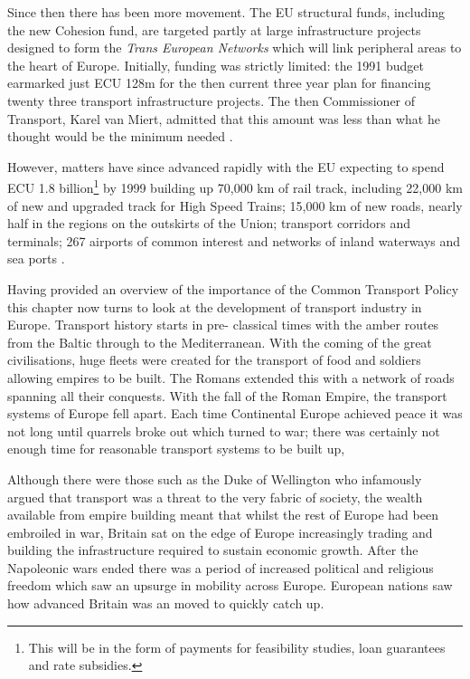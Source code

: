 Since then there has been more movement. The EU structural funds, including the new Cohesion fund, are targeted partly at large infrastructure projects designed to form the \textit{Trans European Networks} which will link peripheral areas to the heart of Europe. Initially, funding was strictly limited: the 1991 budget earmarked just ECU 128m for the then current three year plan for financing twenty three transport infrastructure projects. The then Commissioner of Transport, Karel van Miert, admitted that this amount was less than what he thought would be the minimum needed \citep{EC:1992}.

However, matters have since advanced rapidly with the EU expecting to spend ECU 1.8 billion\footnote{This will be in the form of payments for feasibility studies, loan guarantees and rate subsidies.} by 1999 building up 70,000 km of rail track, including 22,000 km of new and upgraded track for High Speed Trains; 15,000 km of new roads, nearly half in the regions on the outskirts of the Union; transport corridors and terminals; 267 airports of common interest and networks of inland waterways and sea ports \citep{EU:1997}.

Having provided an overview of the importance of the Common Transport Policy this chapter now turns to look at the development of transport industry in Europe. Transport history starts in pre- classical times with the amber routes from the Baltic through to the Mediterranean. With the coming of the great civilisations, huge fleets were created for the transport of food and soldiers allowing empires to be built. The Romans extended this with a network of roads spanning all their conquests. With the fall of the Roman Empire, the transport systems of Europe fell apart. Each time Continental Europe achieved peace it was not long until quarrels broke out which turned to war; there was certainly not enough time for reasonable transport systems to be built up,

Although there were those such as the Duke of Wellington who infamously argued that transport was a threat to the very fabric of society, the wealth available from empire building meant that whilst the rest of Europe had been embroiled in war, Britain sat on the edge of Europe increasingly trading and building the infrastructure required to sustain economic growth. After the Napoleonic wars ended there was a period of increased political and religious freedom which saw an upsurge in mobility across Europe. European nations saw how advanced Britain was an moved to quickly catch up.


